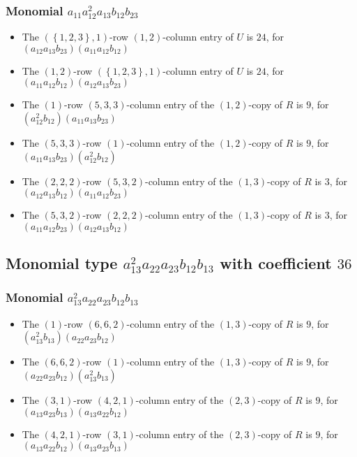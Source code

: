 \documentclass{article}
\begin{document}
\subsubsection{Monomial $ a_{11} a_{12}^{2} a_{13} b_{12} b_{23} $}

\begin{itemize}
\item The $ \left(\left\{1, 2, 3\right\}, 1\right) $-row $ \left(1, 2\right) $-column entry of $U$ is $ 24 $, for $( a_{12} a_{13} b_{23} )( a_{11} a_{12} b_{12} )$ 
\item The $ \left(1, 2\right) $-row $ \left(\left\{1, 2, 3\right\}, 1\right) $-column entry of $U$ is $ 24 $, for $( a_{11} a_{12} b_{12} )( a_{12} a_{13} b_{23} )$ 
\item The $(1)$-row $(5, 3, 3)$-column entry of the $ \left(1, 2\right) $-copy of $R$ is $ 9 $, for $( a_{12}^{2} b_{12} )( a_{11} a_{13} b_{23} )$ 
\item The $(5, 3, 3)$-row $(1)$-column entry of the $ \left(1, 2\right) $-copy of $R$ is $ 9 $, for $( a_{11} a_{13} b_{23} )( a_{12}^{2} b_{12} )$ 
\item The $(2, 2, 2)$-row $(5, 3, 2)$-column entry of the $ \left(1, 3\right) $-copy of $R$ is $ 3 $, for $( a_{12} a_{13} b_{12} )( a_{11} a_{12} b_{23} )$ 
\item The $(5, 3, 2)$-row $(2, 2, 2)$-column entry of the $ \left(1, 3\right) $-copy of $R$ is $ 3 $, for $( a_{11} a_{12} b_{23} )( a_{12} a_{13} b_{12} )$ 
\end{itemize}
\subsection{Monomial type $ a_{13}^{2} a_{22} a_{23} b_{12} b_{13} $ with coefficient $ 36 $}

\subsubsection{Monomial $ a_{13}^{2} a_{22} a_{23} b_{12} b_{13} $}

\begin{itemize}
\item The $(1)$-row $(6, 6, 2)$-column entry of the $ \left(1, 3\right) $-copy of $R$ is $ 9 $, for $( a_{13}^{2} b_{13} )( a_{22} a_{23} b_{12} )$ 
\item The $(6, 6, 2)$-row $(1)$-column entry of the $ \left(1, 3\right) $-copy of $R$ is $ 9 $, for $( a_{22} a_{23} b_{12} )( a_{13}^{2} b_{13} )$ 
\item The $(3, 1)$-row $(4, 2, 1)$-column entry of the $ \left(2, 3\right) $-copy of $R$ is $ 9 $, for $( a_{13} a_{23} b_{13} )( a_{13} a_{22} b_{12} )$ 
\item The $(4, 2, 1)$-row $(3, 1)$-column entry of the $ \left(2, 3\right) $-copy of $R$ is $ 9 $, for $( a_{13} a_{22} b_{12} )( a_{13} a_{23} b_{13} )$ 
\end{itemize}
\end{document}
